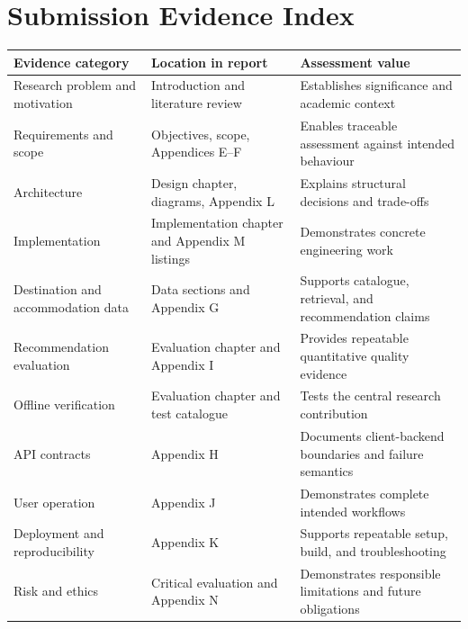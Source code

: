 \section{Submission Evidence Index}
\begin{longtable}{p{4.5cm}p{5.0cm}p{4.5cm}}
\toprule
\textbf{Evidence category} & \textbf{Location in report} & \textbf{Assessment value} \\
\midrule
Research problem and motivation & Introduction and literature review & Establishes significance and academic context \\
Requirements and scope & Objectives, scope, Appendices E--F & Enables traceable assessment against intended behaviour \\
Architecture & Design chapter, diagrams, Appendix L & Explains structural decisions and trade-offs \\
Implementation & Implementation chapter and Appendix M listings & Demonstrates concrete engineering work \\
Destination and accommodation data & Data sections and Appendix G & Supports catalogue, retrieval, and recommendation claims \\
Recommendation evaluation & Evaluation chapter and Appendix I & Provides repeatable quantitative quality evidence \\
Offline verification & Evaluation chapter and test catalogue & Tests the central research contribution \\
API contracts & Appendix H & Documents client-backend boundaries and failure semantics \\
User operation & Appendix J & Demonstrates complete intended workflows \\
Deployment and reproducibility & Appendix K & Supports repeatable setup, build, and troubleshooting \\
Risk and ethics & Critical evaluation and Appendix N & Demonstrates responsible limitations and future obligations \\
\bottomrule
\end{longtable}
